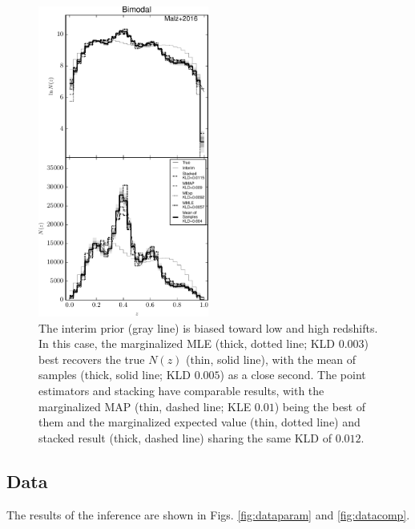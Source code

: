 \documentclass[preprint]{aastex}
\begin{document}

\begin{figure}
\includegraphics[width=0.5\textwidth]{figs/bint/comps.pdf}
\caption{The interim prior (gray line) is biased toward low and high redshifts. 
 In this case, the marginalized MLE (thick, dotted line; KLD $0.003$) best 
recovers the true $N(z)$ (thin, solid line), with the mean of samples (thick, 
solid line; KLD $0.005$) as a close second.  The point estimators and stacking 
have comparable results, with the marginalized MAP (thin, dashed line; KLE 
$0.01$) being the best of them and the marginalized expected value (thin, 
dotted line) and stacked result (thick, dashed line) sharing the same KLD of 
$0.012$.}
\label{fig:intb-comp}
\end{figure}

\subsection{Data}
\label{sec:boss}

The results of the inference are shown in Figs. \ref{fig:dataparam} and 
\ref{fig:datacomp}.  
\end{document}
